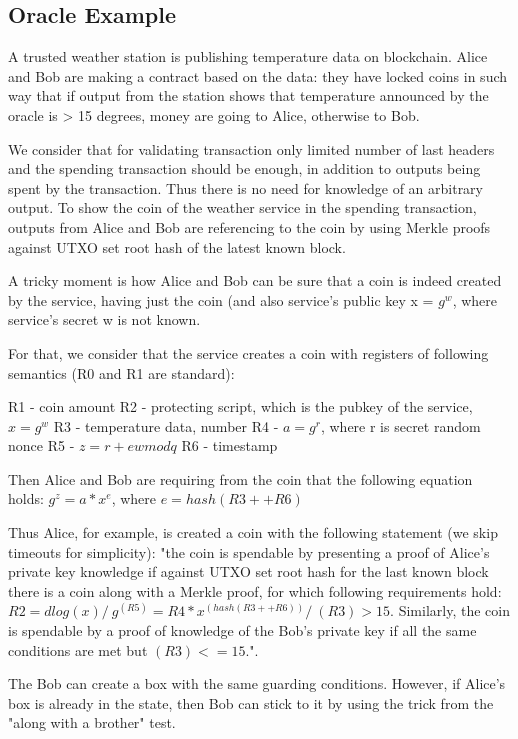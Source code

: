 \documentclass[]{llncs}
\newcommand{\authnote}[2]{\marginpar{\parbox{\marginparwidth}{\tiny %
  \textsf{#1 {\textcolor{blue}{notes: #2}}}}}%
  \textcolor{blue}{\textbf{\dag}}}
\newcommand{\authnote}[2]{
  \textsf{#1 \textcolor{blue}{: #2}}}
\newcommand{\authnote}[2]{}
\newcommand{\knote}[1]{{\authnote{\textcolor{green}{kushti notes}}{#1}}}
\begin{document}
\subsection{Oracle Example}

\knote{Text below is just copied from code comments, polish it}

A trusted weather station is publishing temperature data on blockchain. Alice and Bob are making a contract based on the data:
they have locked coins in such way that if output from the station shows that temperature announced by the oracle is > 15 degrees, money are going to Alice, otherwise to Bob.
    
We consider that for validating transaction only limited number of last headers and the spending transaction should be enough, in addition to outputs being spent by the transaction. Thus there is no need for knowledge of an arbitrary output. To show the coin of the weather service in the spending transaction, outputs from Alice and Bob are referencing to the coin by using Merkle proofs against UTXO set root hash of the latest known block.
    
A tricky moment is how Alice and Bob can be sure that a coin is indeed created by the service, having just the coin (and also service's public key x = $g^w$, where service's secret w is not known.
    
For that, we consider that the service creates a coin with registers of following semantics (R0 and R1 are standard):
    
R1 - coin amount
R2 - protecting script, which is the pubkey of the service, $x = g^w$
R3 - temperature data, number
R4 - $a = g^r$, where r is secret random nonce
R5 - $z = r + ew mod q$
R6 - timestamp
    
Then Alice and Bob are requiring from the coin that the following equation holds: $g^z = a * x^e$, where $e = hash(R3 ++ R6)$
    
Thus Alice, for example, is created a coin with the following statement (we skip timeouts for simplicity):
"the coin is spendable by presenting a proof of Alice's private key knowledge if against UTXO set root hash for
the last known block there is a coin along with a Merkle proof, for which following requirements hold:
$R2 = dlog(x) /\ g^(R5) = R4 * x^(hash(R3 ++ R6)) /\ (R3) > 15$. Similarly, the coin is spendable by a proof of
knowledge of the Bob's private key if all the same conditions are met but $(R3) <= 15$.".
    
The Bob can create a box with the same guarding conditions. However, if Alice's box is already in the state, then Bob can stick to it by using the trick from the "along with a brother" test.
\end{document}
